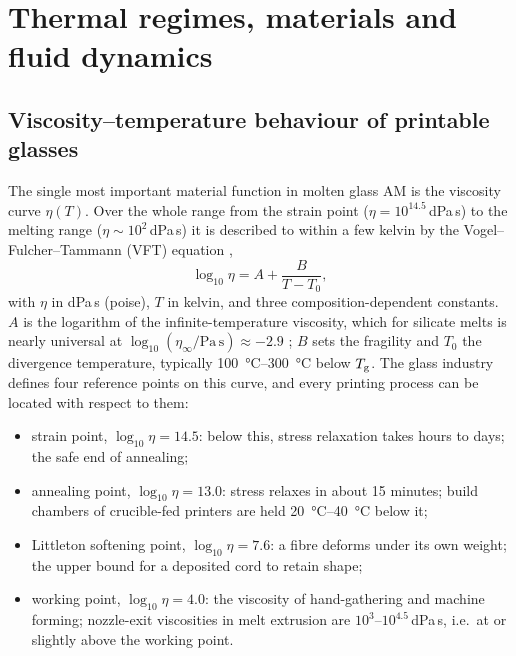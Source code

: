 \section{Thermal regimes, materials and fluid dynamics}
\label{sec:physics}

\subsection{Viscosity--temperature behaviour of printable glasses}
The single most important material function in molten glass AM is the viscosity curve \(\eta(T)\). Over the whole range from the strain point (\(\eta = 10^{14.5}\,\)dPa\,s) to the melting range (\(\eta \sim 10^{2}\,\)dPa\,s) it is described to within a few kelvin by the Vogel--Fulcher--Tammann (VFT) equation \citep{fluegel2007,mauro2009},
\begin{equation}
  \log_{10}\eta = A + \frac{B}{T - T_0},
  \label{eq:vft}
\end{equation}
with \(\eta\) in dPa\,s (poise), \(T\) in kelvin, and three composition-dependent constants. \(A\) is the logarithm of the infinite-temperature viscosity, which for silicate melts is nearly universal at \(\log_{10}(\eta_\infty/\mathrm{Pa\,s}) \approx -2.9\) \citep{mauro2009}; \(B\) sets the fragility and \(T_0\) the divergence temperature, typically \SIrange{100}{300}{\celsius} below \(T_{\mathrm{g}}\). The glass industry defines four reference points on this curve, and every printing process can be located with respect to them:

\begin{itemize}[leftmargin=*,itemsep=1pt]
  \item strain point, \(\log_{10}\eta = 14.5\): below this, stress relaxation takes hours to days; the safe end of annealing;
  \item annealing point, \(\log_{10}\eta = 13.0\): stress relaxes in about 15 minutes; build chambers of crucible-fed printers are held \SIrange{20}{40}{\celsius} below it;
  \item Littleton softening point, \(\log_{10}\eta = 7.6\): a fibre deforms under its own weight; the upper bound for a deposited cord to retain shape;
  \item working point, \(\log_{10}\eta = 4.0\): the viscosity of hand-gathering and machine forming; nozzle-exit viscosities in melt extrusion are \(10^{3}\)--\(10^{4.5}\)\,dPa\,s, i.e.\ at or slightly above the working point.
\end{itemize}

